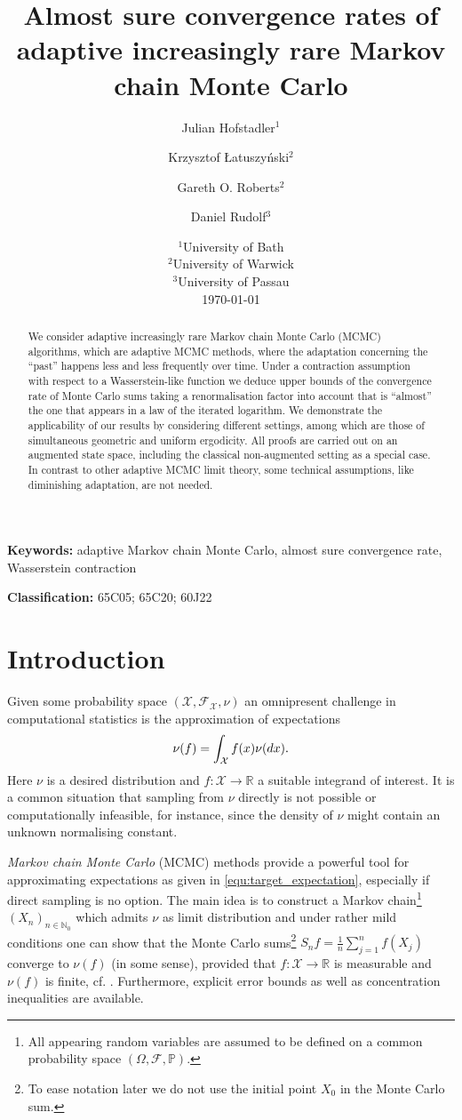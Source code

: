 \documentclass[12pt]{article}
\title{Almost sure convergence rates of adaptive increasingly rare Markov chain Monte Carlo}
\author{Julian Hofstadler$^1$ \and Krzysztof {{\L}atuszy\'{n}ski}$^2$  \and Gareth O. Roberts$^2$ \and Daniel Rudolf$^3$}
\date{%
	$^1$University of Bath\\%
	$^2$University of Warwick\\%
	$^3$University of Passau\\[2ex]%
	\today
}
\theoremstyle{definition}
\renewcommand{\d}{{\rm d}}
\newcommand{\N}{\mathbb{N}}
\newcommand{\R}{\mathbb{R}}
\newcommand{\cX}{\mathcal{X}}
\begin{document}
\maketitle	
\begin{abstract}
We consider adaptive increasingly rare Markov chain Monte Carlo (MCMC) algorithms, which are adaptive MCMC methods, where the adaptation concerning the ``past'' happens less and less frequently over time. Under a contraction assumption with respect to a Wasserstein-like function we deduce upper bounds of the convergence rate of Monte Carlo sums taking a renormalisation factor into account that is ``almost'' the one that appears in a law of the iterated logarithm. We demonstrate the applicability of our results by considering different settings, among which are those of simultaneous geometric and uniform ergodicity. All proofs are carried out on an augmented state space, including the classical non-augmented setting as a special case. In contrast to other adaptive MCMC limit theory, some technical assumptions, like diminishing adaptation, are not needed.
\end{abstract}


\textbf{Keywords:} adaptive Markov chain Monte Carlo, almost sure convergence rate, Wasserstein contraction


\textbf{Classification:} 65C05; 65C20; 60J22 
\section{Introduction}

Given some probability space $(\cX, \mathcal{F}_\cX, \nu)$ an omnipresent challenge in computational statistics is the approximation of expectations  
\begin{equation}\label{equ:target_expectation}
	\nu(f) =
	\int_\cX f(x) \nu( \d x).
\end{equation}
Here $\nu $ is a desired distribution and $f \colon \cX \to \R$ a suitable integrand of interest. 
It is a common situation that sampling from $\nu$ directly is not possible or computationally infeasible, for instance, since the density of $\nu$ might contain an unknown normalising constant. 

\textit{Markov chain Monte Carlo} (MCMC) methods provide a powerful tool for approximating expectations as given in \eqref{equ:target_expectation}, especially if direct sampling is no option.
The main idea is to construct a Markov chain\footnote{{All appearing random variables are assumed to be defined on a common probability space $(\Omega,\mathcal{F},\mathbb{P})$.}} $(X_n)_{n \in \N_0}$ which admits $\nu$ as limit distribution and 
under rather mild conditions one can show that the Monte Carlo sums\footnote{To ease notation later we do not use the initial point $X_0$ in the Monte Carlo sum.} 
$S_n f = \frac{1}{n}\sum_{j=1}^{n}f(X_j)$
converge to $\nu(f)$ (in some sense), provided that $f\colon \cX \to \R$ is measurable and $\nu(f)$ is finite, cf. \cite{meyn2012markov,douc2018markov}.
Furthermore, explicit error bounds \cite{rudolf2012explicit,latuszynski2015nonasymptotic} as well as concentration inequalities \cite{glynn2002hoeffding,MIASOJEDOW2014hoeffding} are available.  
\end{document}
